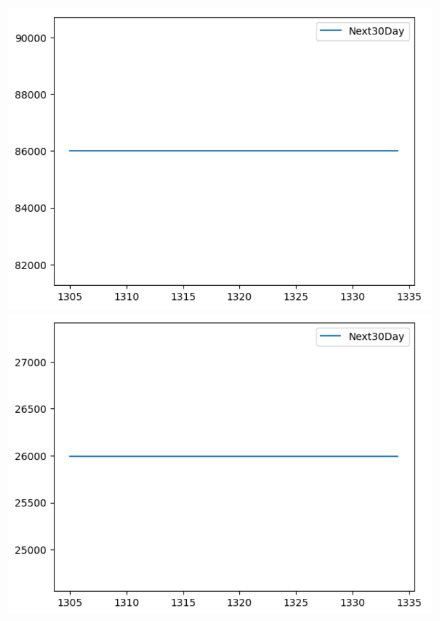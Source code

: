 \begin{figure}[H]
\begin{minipage}{0.15\textwidth}
    \end{minipage}
    \hfill
        \begin{minipage}{0.15\textwidth}
    \centering
    \includegraphics[width=1\textwidth]{resources/chapter-5/newdata/predicted/VCB_ARIMA_9-1_30days.png}
    \end{minipage}
    \hfill
    \begin{minipage}{0.15\textwidth}
    \centering
    \includegraphics[width=1\textwidth]{resources/chapter-5/newdata/predicted/EIB_ARIMA_7-3_30days.png}
    \end{minipage}
    \hfill
    \begin{minipage}{0.15\textwidth}
    \centering

\end{minipage}
\end{figure}
